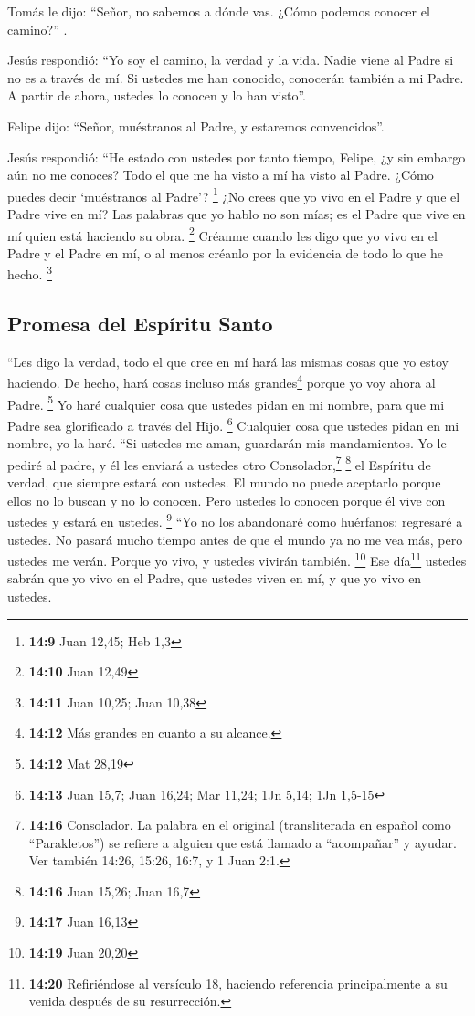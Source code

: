  Tomás le dijo: ``Señor, no sabemos a dónde vas. ¿Cómo
podemos conocer el camino?'' .

 Jesús respondió: ``Yo soy el camino, la verdad y la vida.
Nadie viene al Padre si no es a través de mí.  Si ustedes
me han conocido, conocerán también a mi Padre. A partir de ahora,
ustedes lo conocen y lo han visto''.

 Felipe dijo: ``Señor, muéstranos al Padre, y estaremos
convencidos''.

 Jesús respondió: ``He estado con ustedes por tanto
tiempo, Felipe, ¿y sin embargo aún no me conoces? Todo el que me ha
visto a mí ha visto al Padre. ¿Cómo puedes decir `muéstranos al Padre'?
\footnote{\textbf{14:9} Juan 12,45; Heb 1,3}  ¿No crees
que yo vivo en el Padre y que el Padre vive en mí? Las palabras que yo
hablo no son mías; es el Padre que vive en mí quien está haciendo su
obra. \footnote{\textbf{14:10} Juan 12,49}  Créanme
cuando les digo que yo vivo en el Padre y el Padre en mí, o al menos
créanlo por la evidencia de todo lo que he hecho. \footnote{\textbf{14:11}
  Juan 10,25; Juan 10,38}

\hypertarget{promesa-del-espuxedritu-santo}{%
\subsection{Promesa del Espíritu
Santo}\label{promesa-del-espuxedritu-santo}}

 ``Les digo la verdad, todo el que cree en mí hará las
mismas cosas que yo estoy haciendo. De hecho, hará cosas incluso más
grandes\footnote{\textbf{14:12} Más grandes en cuanto a su alcance.}
porque yo voy ahora al Padre. \footnote{\textbf{14:12} Mat 28,19}
 Yo haré cualquier cosa que ustedes pidan en mi nombre,
para que mi Padre sea glorificado a través del Hijo. \footnote{\textbf{14:13}
  Juan 15,7; Juan 16,24; Mar 11,24; 1Jn 5,14; 1Jn 1,5-15}
 Cualquier cosa que ustedes pidan en mi nombre, yo la
haré.  ``Si ustedes me aman, guardarán mis mandamientos.
 Yo le pediré al padre, y él les enviará a ustedes otro
Consolador,\footnote{\textbf{14:16} Consolador. La palabra en el
  original (transliterada en español como ``Parakletos'') se refiere a
  alguien que está llamado a ``acompañar'' y ayudar. Ver también 14:26,
  15:26, 16:7, y 1 Juan 2:1.} \footnote{\textbf{14:16} Juan 15,26; Juan
  16,7}  el Espíritu de verdad, que siempre estará con
ustedes. El mundo no puede aceptarlo porque ellos no lo buscan y no lo
conocen. Pero ustedes lo conocen porque él vive con ustedes y estará en
ustedes. \footnote{\textbf{14:17} Juan 16,13}  ``Yo no
los abandonaré como huérfanos: regresaré a ustedes.  No
pasará mucho tiempo antes de que el mundo ya no me vea más, pero ustedes
me verán. Porque yo vivo, y ustedes vivirán también. \footnote{\textbf{14:19}
  Juan 20,20}  Ese día\footnote{\textbf{14:20}
  Refiriéndose al versículo 18, haciendo referencia principalmente a su
  venida después de su resurrección.} ustedes sabrán que yo vivo en el
Padre, que ustedes viven en mí, y que yo vivo en ustedes.

